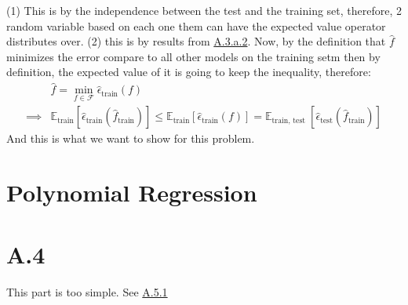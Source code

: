 \documentclass[]{article}
\begin{document}
        (1) This is by the independence between the test and the training set, therefore, 2 random variable based on each one them can have the expected value operator distributes over. (2) this is by results from \hyperref[eqn:A.3.a.2]{A.3.a.2}. Now, by the definition that $\hat{f}$ minimizes the error compare to all other models on the training setm then by definition, the expected value of it is going to keep the inequality, therefore: 
        \begin{align*}\tag{A.3.c.1}\label{eqn:A.3.c.1}
            & \hat{f} = \min_{f\in\mathcal{F}} \hat{\epsilon}_\text{train}(f)
            \\
            \implies & 
            \mathbb{E}_\text{train} 
            \left[\hat{\epsilon}_\text{train}(\hat{f}_\text{train})\right]
            \le 
            \mathbb{E}_\text{train}\left[
                \hat{\epsilon}_\text{train}(f)
            \right]
            =
            \mathbb{E}_{\text{train, test }}\left[
                \hat{\epsilon}_\text{test}
                (\hat{f}_\text{train})
            \right]
        \end{align*}
        And this is what we want to show for this problem. 
\section*{Polynomial Regression}
    \section*{A.4}
        This part is too simple. See \hyperref[lst:A.5.1]{A.5.1}
\end{document}

